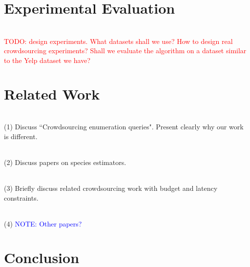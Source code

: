 \documentclass{vldb}
\begin{document}
\section{Experimental Evaluation}

\ \\\textcolor{red}{TODO: design experiments. What datasets shall we use? How to design real crowdsourcing experiments? Shall we evaluate the algorithm on a dataset similar to the Yelp dataset we have?}

\section{Related Work}
\ \\(1) Discuss ``Crowdsourcing enumeration queries". Present clearly why our work is different. 

\ \\(2) Discuss papers on species estimators.

\ \\(3) Briefly discuss related crowdsourcing work with budget and latency constraints.

\ \\(4) \textcolor{blue}{NOTE: Other papers?}


\section{Conclusion}




\end{document}
